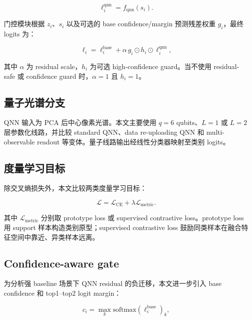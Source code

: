 \documentclass[UTF8,a4paper,zihao=-4,fontset=fandol]{ctexart}
\begin{document}
\begin{equation}
  \ell^{\mathrm{qnn}}_i = f_{\mathrm{qnn}}(s_i).
\end{equation}

门控模块根据 $z_i$、$s_i$ 以及可选的 base confidence/margin 预测残差权重 $g_i$，最终 logits 为：

\begin{equation}
  \ell_i = \ell^{\mathrm{base}}_i + \alpha \, g_i \odot h_i \odot \ell^{\mathrm{qnn}}_i,
\end{equation}

其中 $\alpha$ 为 residual scale，$h_i$ 为可选 high-confidence guard。当不使用 residual-safe 或 confidence guard 时，$\alpha=1$ 且 $h_i=1$。

\subsection{量子光谱分支}

QNN 输入为 PCA 后中心像素光谱。本文主要使用 $q=6$ qubits、$L=1$ 或 $L=2$ 层参数化线路，并比较 standard QNN、data re-uploading QNN 和 multi-observable readout 等变体。量子线路输出经线性分类器映射至类别 logits。

\subsection{度量学习目标}

除交叉熵损失外，本文比较两类度量学习目标：

\begin{equation}
  \mathcal{L} = \mathcal{L}_{\mathrm{CE}} + \lambda \mathcal{L}_{\mathrm{metric}}.
\end{equation}

其中 $\mathcal{L}_{\mathrm{metric}}$ 分别取 prototype loss 或 supervised contrastive loss。prototype loss 用 support 样本构造类别原型；supervised contrastive loss 鼓励同类样本在融合特征空间中靠近、异类样本远离。

\subsection{Confidence-aware gate}

为分析强 baseline 场景下 QNN residual 的负迁移，本文进一步引入 base confidence 和 top1--top2 logit margin：

\begin{equation}
  c_i = \max_k \mathrm{softmax}(\ell^{\mathrm{base}}_i)_k,
\end{equation}
\end{document}
